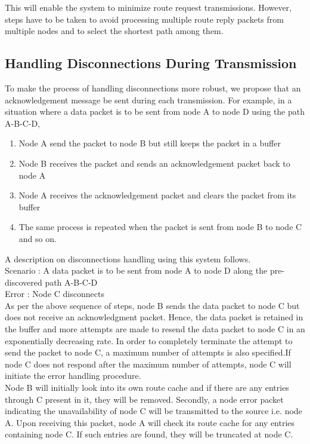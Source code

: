 \documentclass[a4paper,11pt]{article}%
\begin{document}
This will enable the system to minimize route request transmissions.
However, steps have to be taken to avoid processing multiple route reply packets from multiple nodes and to select the shortest path among them.

\subsection{Handling Disconnections During Transmission}


To make the process of handling disconnections more robust, we propose that an acknowledgement message be sent during each transmission. For example, in a situation where a data packet is to be sent from node A to node D using the path A-B-C-D,
\begin{enumerate}[1.]
	\item Node A send the packet to node B but still keeps the packet in a buffer
	\item Node B receives the packet and sends an acknowledgement packet back to node A
	\item Node A receives the acknowledgement packet and clears the packet from its buffer
	\item The same process is repeated when the packet is sent from node B to node C and so on.
\end{enumerate}

A description on disconnections handling using this system follows.\\

Scenario : A data packet is to be sent from node A to node D along the pre-discovered path A-B-C-D\\
Error 	: Node C disconnects\\

As per the above sequence of steps, node B sends the data packet to node C but does not receive an acknowledgment packet. Hence, the data packet is retained in the buffer and more attempts are made to resend the data packet to node C in an exponentially decreasing rate. In order to completely terminate the attempt to send the packet to node C, a maximum number of attempts is also specified.If node C does not respond after the maximum number of attempts, node C will initiate the error handling procedure.\\

Node B will initially look into its own route cache and if there are any entries through C present in it, they will be removed. Secondly, a node error packet indicating the unavailability of node C will be transmitted to the source i.e. node A. Upon receiving this packet, node A will check its route cache for any entries containing node C. If such entries are found, they will be truncated at node C.
\end{document}
